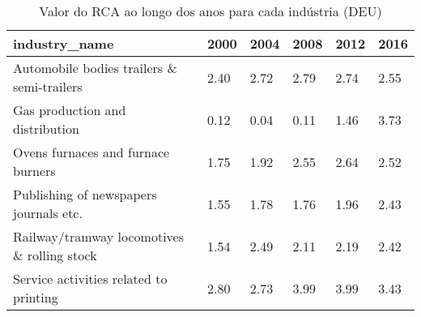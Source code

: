 \begin{table}
\centering
\caption{Valor do RCA ao longo dos anos para cada indústria (DEU)}
\begin{tabular}{p{6cm}p{1.5cm}p{1.5cm}p{1.5cm}p{1.5cm}p{1.5cm}}
\toprule
                              industry\_name & 2000 & 2004 & 2008 & 2012 & 2016 \\
\midrule
 Automobile bodies trailers \& semi-trailers & 2.40 & 2.72 & 2.79 & 2.74 & 2.55 \\
            Gas production and distribution & 0.12 & 0.04 & 0.11 & 1.46 & 3.73 \\
         Ovens furnaces and furnace burners & 1.75 & 1.92 & 2.55 & 2.64 & 2.52 \\
     Publishing of newspapers journals etc. & 1.55 & 1.78 & 1.76 & 1.96 & 2.43 \\
Railway/tramway locomotives \& rolling stock & 1.54 & 2.49 & 2.11 & 2.19 & 2.42 \\
     Service activities related to printing & 2.80 & 2.73 & 3.99 & 3.99 & 3.43 \\
\bottomrule
\end{tabular}
\end{table}
